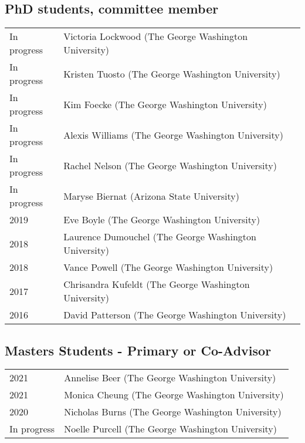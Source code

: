 \documentclass{article}
\begin{document}
\subsection*{PhD students, committee member}
\begin{tabular}{p{}p{}}
In progress & Victoria Lockwood (The George Washington University)\\[4pt]
In progress & Kristen Tuosto (The George Washington University)\\[4pt]
In progress & Kim Foecke (The George Washington University)\\[4pt]
In progress & Alexis Williams (The George Washington University)\\[4pt]
In progress & Rachel Nelson (The George Washington University)\\[4pt]
In progress & Maryse Biernat (Arizona State University)\\[4pt]
2019 & Eve Boyle (The George Washington University)\\[4pt]
2018 & Laurence Dumouchel (The George Washington University)\\[4pt]
2018 & Vance Powell (The George Washington University)\\[4pt]
2017 & Chrisandra Kufeldt (The George Washington University)\\[4pt]
2016 & David Patterson (The George Washington University)\\

\end{tabular}

\subsection*{Masters Students - Primary or Co-Advisor}
\begin{tabular}{p{}p{}}
2021 & Annelise Beer (The George Washington University)\\[4pt]
2021 & Monica Cheung (The George Washington University)\\[4pt]
2020 & Nicholas Burns (The George Washington University)\\[4pt] %
In progress & Noelle Purcell (The George Washington University)\\[4pt]%

\end{tabular}
\end{document}
